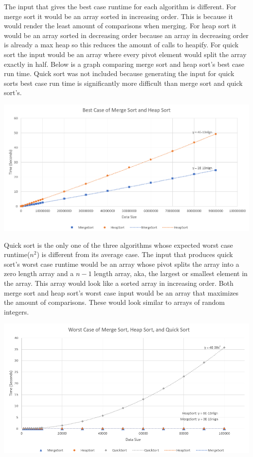 \documentclass[a4paper]{article}
\begin{document}
    \newpage
    The input that gives the best case runtime for each algorithm is different. For 
    merge sort it would be an array sorted in increasing order. This is because it
    would render the least amount of comparisons when merging. For heap sort it would
    be an array sorted in decreasing order because an array in decreasing order is 
    already a max heap so this reduces the amount of calls to heapify. For quick sort
    the input would be an array where every pivot element would split the array 
    exactly in half. Below is a graph comparing merge sort and heap sort's best
    case run time. Quick sort was not included because generating the input for quick
    sorts best case run time is significantly more difficult than merge sort and quick
    sort's.
    \begin{center}
        \includegraphics[scale=0.65]{Best}
    \end{center}
    
    Quick sort is the only one of the three algorithms whose expected worst case 
    runtime($n^{2}$) is different from its average case. The input that produces quick
    sort's worst case runtime would be an array whose pivot splits the array into a 
    zero length array and a $n-1$ length array, aka, the largest or smallest element in 
    the array. This array would look like a sorted array in increasing order. Both 
    merge sort and heap sort's worst case input would be an array that maximizes the
    amount of comparisons. These would look similar to arrays of random integers.
    \begin{center}
        \includegraphics[scale=0.65]{Worst}
    \end{center}
\end{document}
